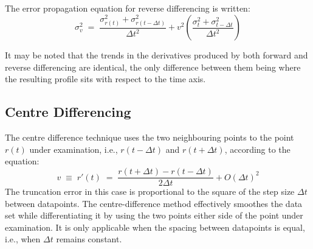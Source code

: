 \documentclass[namedreferences]{SolarPhysics}
\begin{document}
\begin{article}
The error propagation equation for reverse differencing is written:
\begin{equation}
\sigma_v^2 \; = \; \frac{\sigma_{r(t)}^2+\sigma_{r(t-\Delta t)}^2}{\Delta t^2} + v^2 \left( \frac{\sigma_{t}^2+\sigma_{t-\Delta t}^2}{\Delta t^2} \right)
\end{equation}

It may be noted that the trends in the derivatives produced by both forward and reverse differencing are identical, the only difference between them being where the resulting profile sits with respect to the time axis.


\subsection{Centre Differencing}
\label{sect_centre}

The centre difference technique uses the two neighbouring points to the point $r(t)$ under examination, i.e., $r(t - \Delta t)$ and $r(t + \Delta t)$, according to the equation:
\begin{equation}
\label{eqn_centre}
v \; \equiv \; r'(t) \; = \; \frac{r(t + \Delta t) - r(t - \Delta t)}{2 \Delta t} + O(\Delta t)^{2}
\end{equation}
The truncation error in this case is proportional to the square of the step size $\Delta t$ between datapoints. %
The centre-difference method effectively smoothes the data set while differentiating it by using the two points either side of the point under examination. It is only applicable when the spacing between datapoints is equal, i.e., when $\Delta t$ remains constant. %
 

\end{article}
\end{document}
